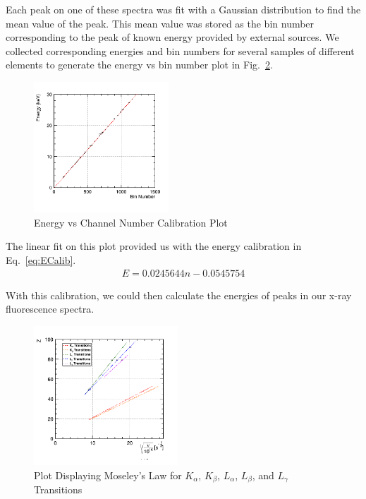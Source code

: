 \documentclass[%
 reprint,
 amsmath,amssymb,
 aps,
 pra,
]{revtex4-1}
\begin{document}
Each peak on one of these spectra was fit with a Gaussian distribution to find the mean value of the peak. This mean value was stored as the bin number corresponding to the peak of known energy provided by external sources. We collected corresponding energies and bin numbers for several samples of different elements to generate the energy vs bin number plot in Fig.~\ref{Fig:Evsbin}.

\begin{figure}[H]
	\centering
	\includegraphics[width=0.45\textwidth]{EvsBin.png}
	\caption{Energy vs Channel Number Calibration Plot}
	\label{Fig:Evsbin}
\end{figure}

The linear fit on this plot provided us with the energy calibration in Eq.~\ref{eq:ECalib}.
\begin{gather}\label{eq:ECalib}
E = 0.0245644n - 0.0545754
\end{gather}

With this calibration, we could then calculate the energies of peaks in our x-ray fluorescence spectra.



\begin{figure}[H]
	\centering
	\includegraphics[width=0.48\textwidth]{MoseleyLawPlot.png}
	\caption{Plot Displaying Moseley's Law for $K_{\alpha}$, $K_{\beta}$, $L_{\alpha}$, $L_{\beta}$, and $L_{\gamma}$ Transitions}
	\label{Fig:Evsbin}
\end{figure} 
\end{document}

